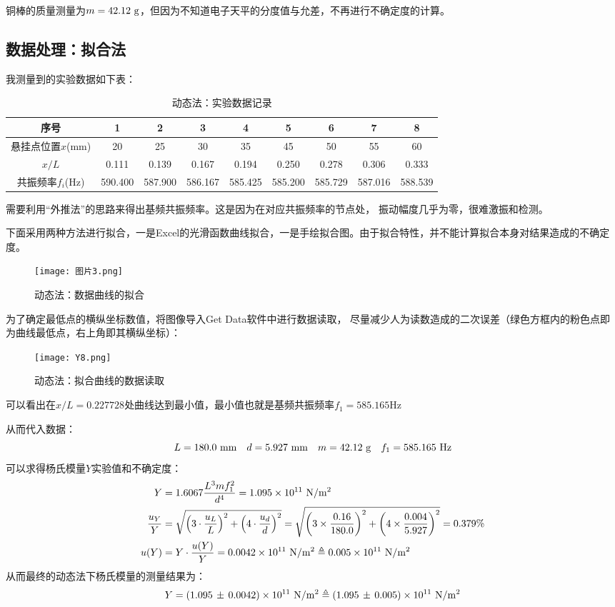 \documentclass[11pt]{article}
\begin{document}
铜棒的质量测量为$m=42.12\,\, {\rm g}$，但因为不知道电子天平的分度值与允差，不再进行不确定度的计算。

\subsection{数据处理：拟合法}

我测量到的实验数据如下表：
\begin{table}[H]
    \centering
    \begin{tabular}{ccccccccc}
        \toprule
        序号 & 1 & 2 & 3 & 4 & 5 & 6 & 7 & 8 \\ 
        \midrule
        悬挂点位置$x$(mm) & 20 & 25 & 30 & 35 & 45 & 50 & 55 & 60 \\ 
        $x/L$ & 0.111  & 0.139  & 0.167  & 0.194  & 0.250  & 0.278  & 0.306  & 0.333  \\ 
        共振频率$f_i$(Hz) & 590.400  & 587.900  & 586.167  & 585.425  & 585.200  & 585.729  & 587.016  & 588.539 \\ 
        \bottomrule
    \end{tabular}
    \caption{动态法：实验数据记录}
\end{table}

需要利用“外推法”的思路来得出基频共振频率。这是因为在对应共振频率的节点处，
振动幅度几乎为零，很难激振和检测。

下面采用两种方法进行拟合，一是Excel的光滑函数曲线拟合，一是手绘拟合图。由于拟合特性，并不能计算拟合本身对结果造成的不确定度。


\begin{figure}[H]
    \centering
    \texttt{[image: 图片3.png]}
    \caption{动态法：数据曲线的拟合}
\end{figure}
为了确定最低点的横纵坐标数值，将图像导入Get Data软件中进行数据读取，
尽量减少人为读数造成的二次误差（绿色方框内的粉色点即为曲线最低点，右上角即其横纵坐标）：
\begin{figure}[H]
    \centering
    \texttt{[image: Y8.png]}
    \caption{动态法：拟合曲线的数据读取}
\end{figure}
可以看出在$x/L=0.227728$处曲线达到最小值，最小值也就是基频共振频率$f_1=585.165$Hz

从而代入数据：
\[
    L=180.0\,\,{\rm mm}\quad d=5.927\,\,{\rm mm}\quad m=42.12\,\,{\rm g}
    \quad f_1=585.165\,\,{\rm Hz}
\]
可以求得杨氏模量$Y$实验值和不确定度：
\begin{align*}
    Y& =1.6067\frac{L^3mf^2_1}{d^4}=1.095\times 10^{11}\,\,{\rm N/m^2}\\
    \frac{u_Y}{Y}&=\sqrt{\left(3\cdot \frac{u_L}{L}\right)^2
    +\left(4\cdot\frac{u_d}{d}\right)^2}
    =\sqrt{\left(3\times \frac{0.16}{180.0}\right)^2
    +\left(4\times\frac{ 0.004}{5.927}\right)^2}
    =0.379\%
    \\ u(Y)&=Y\cdot\frac{u(Y)}{Y}=0.0042\times 10^{11}\,\,{\rm N/m^2}\triangleq0.005\times10^{11}\,\,{\rm N/m^2}
\end{align*}
从而最终的动态法下杨氏模量的测量结果为：
\[
    Y=(1.095\,\pm\,0.0042) \times10^{11}\,\,{\rm N/m^2}\triangleq (1.095\,\pm \,0.005)\times10^{11}\,\,{\rm N/m^2}
\]
\end{document}
